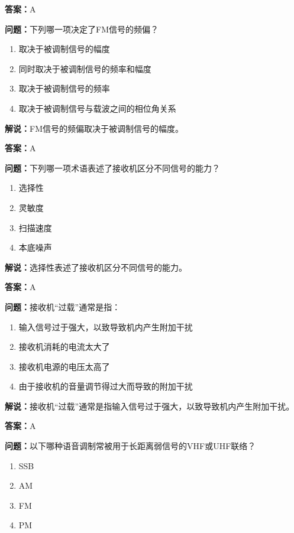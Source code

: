 \textbf{答案：}A

\textbf{问题：}下列哪一项决定了FM信号的频偏？

\begin{enumerate}[label=\Alph*), leftmargin=3em]
	\item 取决于被调制信号的幅度
	\item 同时取决于被调制信号的频率和幅度
	\item 取决于被调制信号的频率
	\item 取决于被调制信号与载波之间的相位角关系
\end{enumerate}

\textbf{解说：}FM信号的频偏取决于被调制信号的幅度。%

\textbf{答案：}A

\textbf{问题：}下列哪一项术语表述了接收机区分不同信号的能力？

\begin{enumerate}[label=\Alph*), leftmargin=3em]
	\item 选择性
	\item 灵敏度
	\item 扫描速度
	\item 本底噪声
\end{enumerate}

\textbf{解说：}选择性表述了接收机区分不同信号的能力。%

\textbf{答案：}A

\textbf{问题：}接收机“过载”通常是指：

\begin{enumerate}[label=\Alph*), leftmargin=3em]
	\item 输入信号过于强大，以致导致机内产生附加干扰
	\item 接收机消耗的电流太大了
	\item 接收机电源的电压太高了
	\item 由于接收机的音量调节得过大而导致的附加干扰
\end{enumerate}

\textbf{解说：}接收机“过载”通常是指输入信号过于强大，以致导致机内产生附加干扰。%

\textbf{答案：}A

\textbf{问题：}以下哪种语音调制常被用于长距离弱信号的VHF或UHF联络？

\begin{enumerate}[label=\Alph*), leftmargin=3em]
	\item SSB
	\item AM
	\item FM
	\item PM
\end{enumerate}

